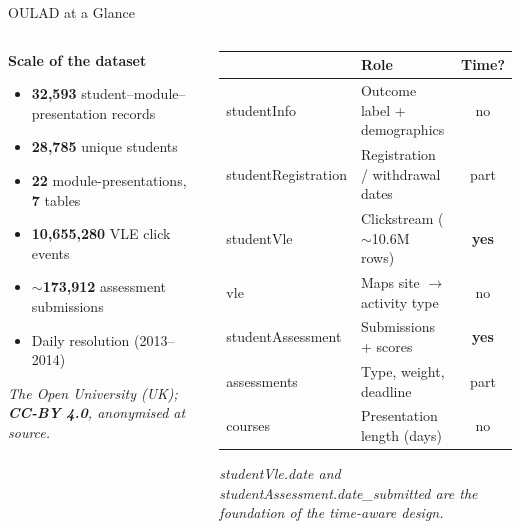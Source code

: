 \documentclass[aspectratio=169,10pt]{beamer}
\newcommand{\hc}[1]{{\bfseries\color{white}#1}}
\newcommand{\tcode}[1]{{\ttfamily #1}}
\newcommand{\takeaway}[1]{\vspace{2pt}\par{\footnotesize\itshape #1}}
\begin{document}
\begin{frame}{OULAD at a Glance}
  \begin{columns}[T]
    \begin{column}{0.42\textwidth}
      \footnotesize\textbf{Scale of the dataset}
      \begin{itemize}\setlength\itemsep{0.25em}
        \item \textbf{32,593} student–module–presentation records
        \item \textbf{28,785} unique students
        \item \textbf{22} module-presentations, \textbf{7} tables
        \item \textbf{10,655,280} VLE click events
        \item $\sim$\textbf{173,912} assessment submissions
        \item Daily resolution (2013–2014)
      \end{itemize}
      \takeaway{The Open University (UK); \textbf{CC-BY 4.0}, anonymised at source.}
    \end{column}
    \begin{column}{0.58\textwidth}
      {\scriptsize
      \setlength{\tabcolsep}{4pt}\renewcommand{\arraystretch}{1.25}
      \begin{tabularx}{\textwidth}{@{}>{\ttfamily}l Y c@{}}
        \toprule
        \rowcolor{ccnured}\hc{Table} & \hc{Role} & \hc{Time?}\\
        \midrule
        studentInfo & Outcome label + demographics & no\\
        studentRegistration & Registration / withdrawal dates & part\\
        studentVle & Clickstream ($\sim$10.6M rows) & \textbf{yes}\\
        vle & Maps site $\to$ activity type & no\\
        studentAssessment & Submissions + scores & \textbf{yes}\\
        assessments & Type, weight, deadline & part\\
        courses & Presentation length (days) & no\\
        \bottomrule
      \end{tabularx}}
      \takeaway{\tcode{studentVle.date} and \tcode{studentAssessment.date\_submitted} are the foundation of the time-aware design.}
    \end{column}
  \end{columns}
\end{frame}
\end{document}
